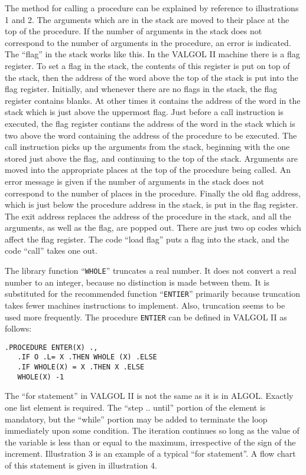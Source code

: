 \documentclass[notitlepage,twocolumn]{report}
\begin{document}
The method for calling a procedure can be explained by reference to
illustrations 1 and 2. The arguments which are in the stack are moved
to their place at the top of the procedure. If the number of arguments
in the stack does not correspond to the number of arguments in the
procedure, an error is indicated. The ``flag'' in the stack works like
this. In the VALGOL II machine there is a flag register. To set a flag
in the stack, the contents of this register is put on top of the
stack, then the address of the word above the top of the stack is put
into the flag register. Initially, and whenever there are no flags in
the stack, the flag register contains blanks. At other times it
contains the address of the word in the stack which is just above the
uppermost flag. Just before a call instruction is executed, the flag
register contians the address of the word in the stack which is two
above the word containing the address of the procedure to be
executed. The call instruction picks up the arguments from the stack,
beginning with the one stored just above the flag, and continuing to
the top of the stack. Arguments are moved into the appropriate places
at the top of the procedure being called. An error message is given if
the number of arguments in the stack does not correspond to the number
of places in the procedure. Finally the old flag address, which is
just below the procedure address in the stack, is put in the flag
register. The exit address replaces the address of the procedure in
the stack, and all the arguments, as well as the flag, are popped
out. There are just two op codes which affect the flag register. The
code ``load flag'' puts a flag into the stack, and the code ``call''
takes one out.

The library function ``\texttt{WHOLE}'' truncates a real number. It
does not convert a real number to an integer, because no distinction
is made between them. It is substituted for the recommended function
``\texttt{ENTIER}'' primarily because truncation takes fewer machines
instructions to implement. Also, truncation seems to be used more
frequently. The procedure \texttt{ENTIER} can be defined in VALGOL II
as follows:

\begin{verbatim}
.PROCEDURE ENTER(X) .,
   .IF O .L= X .THEN WHOLE (X) .ELSE
   .IF WHOLE(X) = X .THEN X .ELSE
   WHOLE(X) -1
\end{verbatim}

The ``for statement'' in VALGOL II is not the same as it is in
ALGOL. Exactly one list element is required. The ``step .. until''
portion of the element is mandatory, but the ``while'' portion may be
added to terminate the loop immediately upon some condition. The
iteration continues so long as the value of the variable is less than
or equal to the maximum, irrespective of the sign of the
increment. Illustration 3 is an example of a typical ``for
statement''. A flow chart of this statement is given in illustration
4.
\end{document}
